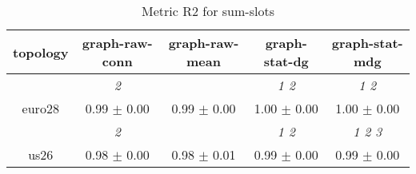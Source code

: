 \begin{table}[h]
\caption{Metric R2 for sum-slots}

        \centering
        \begin{tabular}{
        ccccc} \toprule 
 topology& graph-raw-conn & graph-raw-mean & graph-stat-dg & graph-stat-mdg \\ \toprule
 & \cellcolor[HTML]{EFEFEF} \textit{ 2 }& \cellcolor[HTML]{EFEFEF} & \cellcolor[HTML]{EFEFEF} \textit{ 1 2 }& \cellcolor[HTML]{EFEFEF} \textit{ 1 2 } \\ 
 {euro28}& \cellcolor[HTML]{EFEFEF} 0.99 $\pm$ 0.00& \cellcolor[HTML]{EFEFEF} 0.99 $\pm$ 0.00& \cellcolor[HTML]{EFEFEF} 1.00 $\pm$ 0.00& \cellcolor[HTML]{EFEFEF} 1.00 $\pm$ 0.00 \\ 
& \cellcolor[HTML]{EFEFEF} \textit{ 2 }& \cellcolor[HTML]{EFEFEF} & \cellcolor[HTML]{EFEFEF} \textit{ 1 2 }& \cellcolor[HTML]{EFEFEF} \textit{ 1 2 3 } \\ 
 {us26}& \cellcolor[HTML]{EFEFEF} 0.98 $\pm$ 0.00& \cellcolor[HTML]{EFEFEF} 0.98 $\pm$ 0.01& \cellcolor[HTML]{EFEFEF} 0.99 $\pm$ 0.00& \cellcolor[HTML]{EFEFEF} 0.99 $\pm$ 0.00 \\ 

        \bottomrule
        \end{tabular}%

        \end{table}
        
